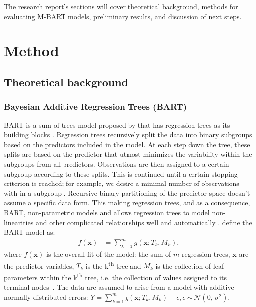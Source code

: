 \documentclass[10pt, a4paper, titlepage]{article}
\begin{document}
The research report's sections will cover theoretical background, methods for evaluating M-BART models, preliminary results, and discussion of next steps.

\section{Method}
\subsection{Theoretical background}
\subsubsection{Bayesian Additive Regression Trees (BART)}
BART is a sum-of-trees model proposed by \citet{chipman2010} that has regression trees as its building blocks \citep{chipman2010, hill2020, james2021}. Regression trees recursively split the data into binary subgroups based on the predictors included in the model. At each step down the tree, these splits are based on the predictor that utmost minimizes the variability within the subgroups from all predictors. Observations are then assigned to a certain subgroup according to these splits. This is continued until a certain stopping criterion is reached; for example, we desire a minimal number of observations with in a subgroup \citep{hastie2017, james2021, salditt2023, breiman1984}. Recursive binary partitioning of the predictor space doesn't assume a specific data form. This making regression trees, and as a consequence, BART, non-parametric models \citep{hastie2017, james2021, salditt2023, breiman1984} and allows regression trees to model non-linearities and other complicated relationships well and automatically \citep{hill2020, burgette2010}.
\citet{chipman2010} define the BART model as:
\begin{align}
\label{eq:BART}
f(\textbf{x}) &= \sum^{m}_{k=1}g(\textbf{x}; T_{k}, M_{k}),
\end{align} where $f(\mathbf{x})$ is the overall fit of the model: the sum of $m$ regression trees, $\textbf{x}$ are the predictor variables, $T_{k}$ is the k\textsuperscript{th} tree and $M_{k}$ is the collection of leaf parameters within the k\textsuperscript{th} tree, i.e. the collection of values assigned to its terminal nodes~\citep{chipman2010, hill2020, james2021, chipman1998, chipman2006}. The data are assumed to arise from a model with additive normally distributed errors: $Y = \sum^{m}_{k=1}g(\textbf{x}; T_{k}, M_{k}) + \epsilon, \epsilon \sim \mathcal{N}(0,\,\sigma^{2})$.
\end{document}
